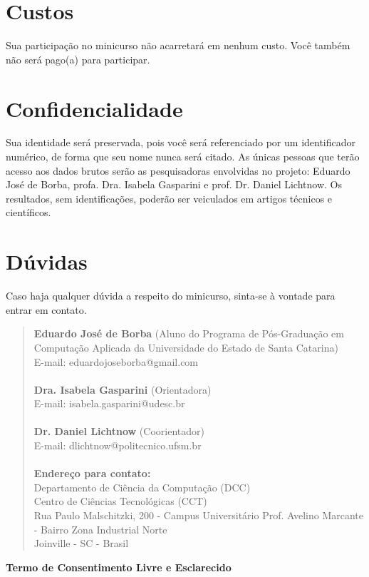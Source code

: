 \section{Custos}
Sua participação no minicurso não acarretará em nenhum custo. Você também não será pago(a) para participar.

\section{Confidencialidade}
Sua identidade será preservada, pois você será referenciado por um identificador numérico, de forma que seu nome nunca será citado. As únicas pessoas que terão acesso aos dados brutos serão as pesquisadoras envolvidas no projeto: Eduardo José de Borba, profa. Dra. Isabela Gasparini e prof. Dr. Daniel Lichtnow. Os resultados, sem identificações, poderão ser veiculados em artigos técnicos e científicos.

\section{Dúvidas}
Caso haja qualquer dúvida a respeito do minicurso, sinta-se à vontade para entrar em contato.

\begin{quote}
\textbf{Eduardo José de Borba} (Aluno do Programa de Pós-Graduação em Computação Aplicada da Universidade do Estado de Santa Catarina)\\
E-mail: eduardojoseborba@gmail.com\\
\\
\textbf{Dra. Isabela Gasparini} (Orientadora)\\
E-mail: isabela.gasparini@udesc.br\\
\\
\textbf{Dr. Daniel Lichtnow} (Coorientador)\\
E-mail: dlichtnow@politecnico.ufsm.br\\
\\
\textbf{Endereço para contato:}\\
Departamento de Ciência da Computação (DCC)\\
Centro de Ciências Tecnológicas (CCT)\\
Rua Paulo Malschitzki, 200 - Campus Universitário Prof. Avelino Marcante - Bairro Zona Industrial Norte\\
Joinville - SC - Brasil\\
\end{quote}


\centerline{\textbf{Termo de Consentimento Livre e Esclarecido}}

